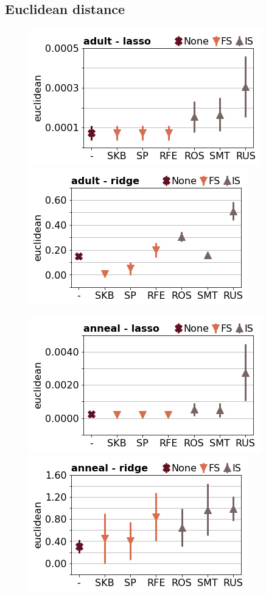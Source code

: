 \documentclass[runningheads,a4paper]{llncs}
\begin{document}
\clearpage
\subsection{Euclidean distance}

\begin{figure}[!h]
\includegraphics[width=0.32\linewidth]{fig/preps_adult_LM_lasso_euclidean.png}
\includegraphics[width=0.32\linewidth]{fig/preps_adult_LM_ridge_euclidean.png}
\end{figure}

\begin{figure}[!h]
\includegraphics[width=0.32\linewidth]{fig/preps_anneal_LM_lasso_euclidean.png}
\includegraphics[width=0.32\linewidth]{fig/preps_anneal_LM_ridge_euclidean.png}
\end{figure}
\end{document}
